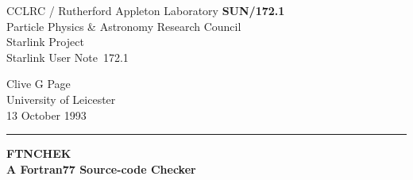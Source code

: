 \documentclass[twoside,11pt]{article}
\newcommand{\stardoccategory}  {Starlink User Note}
\newcommand{\stardocinitials}  {SUN}
\newcommand{\stardocnumber}    {172.1}
\newcommand{\stardocauthors}   {Clive G Page \\ University of Leicester}
\newcommand{\stardocdate}      {13 October 1993}
\newcommand{\stardoctitle}     {FTNCHEK\\[2ex]
                                A Fortran77 Source-code Checker}
\newcommand{\stardocname}{\stardocinitials /\stardocnumber}
\newenvironment{latexonly}{}{}
\begin{document}
\thispagestyle{empty}

\begin{latexonly}
   CCLRC / {\sc Rutherford Appleton Laboratory} \hfill {\bf \stardocname}\\
   {\large Particle Physics \& Astronomy Research Council}\\
   {\large Starlink Project\\}
   {\large \stardoccategory\ \stardocnumber}
   \begin{flushright}
   \stardocauthors\\
   \stardocdate
   \end{flushright}
   \vspace{-4mm}
   \rule{\textwidth}{0.5mm}
   \vspace{5mm}
   \begin{center}
   {\Huge\bf  \stardoctitle}
   \end{center}
   \vspace{5mm}

\end{latexonly}
\end{document}

